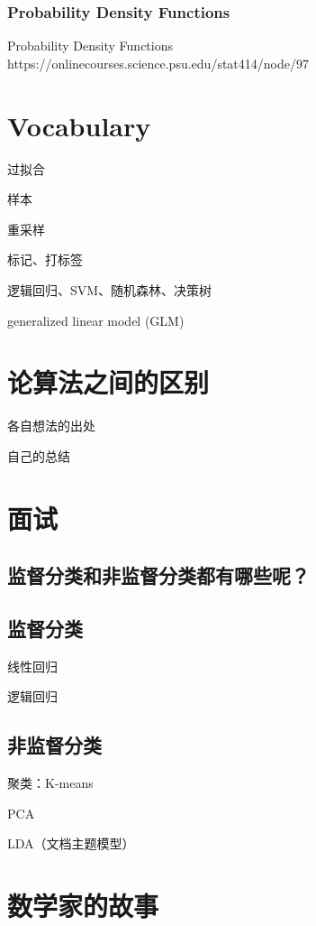 \documentclass[UTF8]{ctexart}
\begin{document}


\subsubsection{Probability Density Functions}

Probability Density Functions https://onlinecourses.science.psu.edu/stat414/node/97

\section{Vocabulary}

过拟合

样本

重采样

标记、打标签

逻辑回归、SVM、随机森林、决策树

generalized linear model (GLM)

\section{论算法之间的区别}

各自想法的出处

自己的总结

\section{面试}

\subsection{监督分类和非监督分类都有哪些呢？}

\subsection{监督分类}

线性回归

逻辑回归


\subsection{非监督分类}

聚类：K-means

PCA

LDA（文档主题模型）

\section{数学家的故事}
\end{document}
